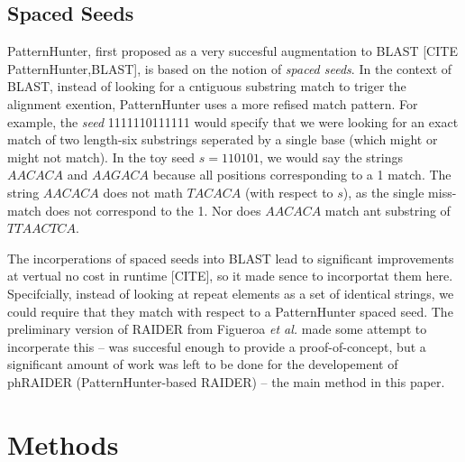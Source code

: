 \documentclass{bmcart}
\begin{document}
\subsection*{Spaced Seeds}
 
PatternHunter, first proposed as a very succesful augmentation to
BLAST [CITE PatternHunter,BLAST], is based on the notion of {\it
  spaced seeds}.  In the context of BLAST, instead of looking for a
cntiguous substring match to triger the alignment exention,
PatternHunter uses a more refised match pattern.  For example, the
{\it seed} 1111110111111 would specify that we were looking for an exact
match of two length-six substrings seperated by a single base (which
might or might not match).  In the toy seed $s=110101$, we would say the
strings $AACACA$ and $AAGACA$ because all positions corresponding to a
1 match.  The string $AACACA$ does not math $TACACA$ (with respect to
$s$), as the single miss-match does not correspond to the 1.  Nor does
$AACACA$ match ant substring of $TTAACTCA$.

The incorperations of spaced seeds into BLAST lead to significant
improvements at vertual no cost in runtime [CITE], so it made sence to
incorportat them here.  Specifcially, instead of looking at repeat
elements as a set of identical strings, we could require that they
match with respect to a PatternHunter spaced seed.  The preliminary
version of RAIDER from Figueroa {\it et al.} made some attempt to
incorperate this -- was succesful enough to provide a
proof-of-concept, but a significant amount of work was left to be done
for the developement of phRAIDER (PatternHunter-based RAIDER) -- the
main method in this paper.

\section{Methods}









\end{document}
